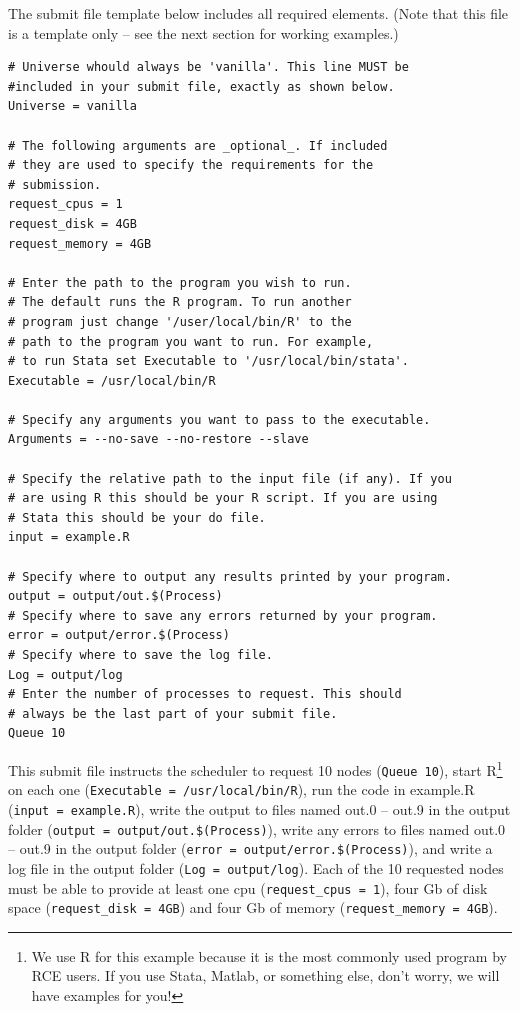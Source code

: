 \documentclass[11pt]{article}
\begin{document}
The submit file template below includes all required elements. (Note that this file is a template only -- see the next section for working examples.)
\begin{verbatim}
# Universe whould always be 'vanilla'. This line MUST be 
#included in your submit file, exactly as shown below.
Universe = vanilla

# The following arguments are _optional_. If included
# they are used to specify the requirements for the
# submission.
request_cpus = 1
request_disk = 4GB
request_memory = 4GB

# Enter the path to the program you wish to run.
# The default runs the R program. To run another
# program just change '/user/local/bin/R' to the
# path to the program you want to run. For example,
# to run Stata set Executable to '/usr/local/bin/stata'.
Executable = /usr/local/bin/R

# Specify any arguments you want to pass to the executable.
Arguments = --no-save --no-restore --slave

# Specify the relative path to the input file (if any). If you
# are using R this should be your R script. If you are using
# Stata this should be your do file.
input = example.R

# Specify where to output any results printed by your program.
output = output/out.$(Process)
# Specify where to save any errors returned by your program.
error = output/error.$(Process)
# Specify where to save the log file.
Log = output/log
# Enter the number of processes to request. This should 
# always be the last part of your submit file.
Queue 10

\end{verbatim}
This submit file instructs the scheduler to request 10 nodes (\texttt{Queue 10}), start R\footnote{We use R for this example because it is the most commonly used program by RCE users. If you use Stata, Matlab, or something else, don't worry, we will have examples for you!} on each one (\texttt{Executable = /usr/local/bin/R}), run the code in example.R (\texttt{input = example.R}), write the output to files named out.0 -- out.9 in the output folder (\texttt{output = output/out.\$(Process)}), write any errors to files named out.0 -- out.9 in the output folder (\texttt{error = output/error.\$(Process)}), and write a log file in the output folder (\texttt{Log = output/log}). Each of the 10 requested nodes must be able to provide at least one cpu (\texttt{request\_cpus = 1}), four Gb of disk space (\texttt{request\_disk = 4GB}) and four Gb of memory (\texttt{request\_memory = 4GB}).
\end{document}
